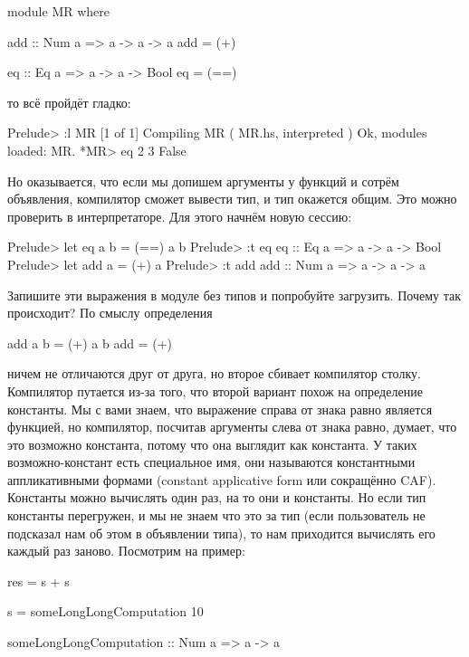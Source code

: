 \begin{code}
module MR where

add :: Num a => a -> a -> a
add = (+)

eq :: Eq a => a -> a -> Bool
eq  = (==)
\end{code}

то всё пройдёт гладко:


\begin{code}
Prelude> :l MR
[1 of 1] Compiling MR               ( MR.hs, interpreted )
Ok, modules loaded: MR.
*MR> eq 2 3
False
\end{code}

Но оказывается, что если мы допишем аргументы у функций и сотрём
объявления, компилятор сможет вывести тип, и тип окажется общим. Это
можно проверить в интерпретаторе. Для этого начнём новую сессию:


\begin{code}
Prelude> let eq a b = (==) a b 
Prelude> :t eq
eq :: Eq a => a -> a -> Bool
Prelude> let add a = (+) a
Prelude> :t add
add :: Num a => a -> a -> a
\end{code}

Запишите эти выражения в модуле без типов и попробуйте загрузить. Почему
так происходит? По смыслу определения


\begin{code}
add a b = (+) a b
add     = (+)
\end{code}

\noindent 

ничем не отличаются друг от друга, но второе сбивает компилятор столку.
Компилятор путается из-за того, что второй вариант похож на определение
константы. Мы с вами знаем, что выражение справа от знака равно является
функцией, но компилятор, посчитав аргументы слева от знака равно,
думает, что это возможно константа, потому что она выглядит как
константа. У таких возможно-констант есть специальное имя, они
называются константными аппликативными формами (constant applicative
form или сокращённо CAF). Константы можно вычислять один раз, на то они
и константы. Но если тип константы перегружен, и мы не знаем что это за
тип (если пользователь не подсказал нам об этом в объявлении типа), то
нам приходится вычислять его каждый раз заново. Посмотрим на пример:


\begin{code}
res = s + s

s = someLongLongComputation 10

someLongLongComputation :: Num a => a -> a
\end{code}

